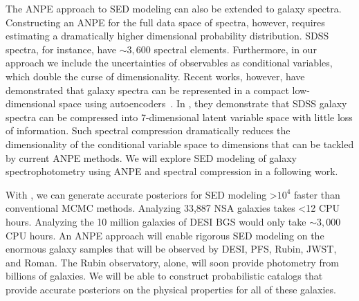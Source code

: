 The ANPE approach to SED modeling can also be extended to galaxy spectra. 
Constructing an ANPE for the full data space of spectra, however, requires
estimating a dramatically higher dimensional probability distribution. 
SDSS spectra, for instance, have ${\sim}3,600$ spectral elements.  
Furthermore, in our approach we include the uncertainties of observables as
conditional variables, which double the curse of dimensionality.
Recent works, however, have demonstrated that galaxy spectra can be represented
in a compact low-dimensional space using autoencoders~\citep[][; Melchior \&
Hahn in prep.]{portillo2020}.
In \cite{portillo2020}, they demonstrate that SDSS galaxy spectra can be
compressed into 7-dimensional latent variable space with little loss of
information. 
Such spectral compression dramatically reduces the dimensionality of the
conditional variable space to dimensions that can be tackled by current ANPE
methods. 
We will explore SED modeling of galaxy spectrophotometry using ANPE and
spectral compression in a following work. 

With \sedflow, we can generate accurate posteriors for SED modeling >$10^4$
faster than conventional MCMC methods. 
Analyzing 33,887 NSA galaxies takes <12 CPU hours.
Analyzing the 10 million galaxies of DESI BGS would only take ${\sim}3,000$ CPU
hours.
An ANPE approach will enable rigorous SED modeling on the enormous galaxy
samples that will be observed by DESI, PFS, Rubin, JWST, and Roman. 
The Rubin observatory, alone, will soon provide photometry from billions of
galaxies. 
We will be able to construct probabilistic catalogs that provide accurate
posteriors on the physical properties for all of these galaxies. 


